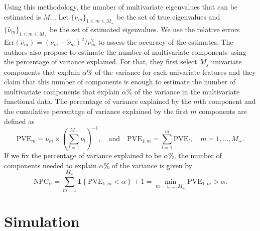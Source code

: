 Using this methodology, the number of multivariate eigenvalues that can be estimated is $M_+$. Let $\{\nu_m\}_{1 \leq m \leq M_+}$ be the set of true eigenvalues and $\{\widehat{\nu}_m\}_{1 \leq m \leq M_+}$ be the set of estimated eigenvalues. We use the relative errors $\text{Err}(\widehat{\nu}_m)  = (\nu_m - \widehat{\nu}_m)^2 / \nu^2_m$ to assess the accuracy of the estimates. The authors also propose to estimate the number of multivariate components using the percentage of variance explained. For that, they first select $M_j$ univariate components that explain $\alpha\%$ of the variance for each univariate features \cite[Chapter 8.2]{ramsayFunctionalDataAnalysis2005} and they claim that this number of components is enough to estimate the number of multivariate components that explain $\alpha\%$ of the variance in the multivariate functional data. The percentage of variance explained by the $m$th component and the cumulative percentage of variance explained by the first $m$ components are defined as
\begin{equation}\label{eq:pve}
     \text{PVE}_m = \nu_m \times \left(\sum_{l = 1}^{M_+} \nu_l\right)^{-1}, \quad\text{and}\quad \text{PVE}_{1:m} = \sum_{l = 1}^m \text{PVE}_l, \quad m = 1, \dots, M_+.
\end{equation}
If we fix the percentage of variance explained to be $\alpha\%$, the number of components needed to explain $\alpha\%$ of the variance is given by
\begin{equation}\label{eq:npc}
     \text{NPC}_{\alpha} = \sum_{m = 1}^{M_{+}} \mathbf{1}\left\{\text{PVE}_{1:m} < \alpha\right\} + 1 = \min_{m = 1, \dots, M_+} \text{PVE}_{1:m} > \alpha.
\end{equation}



\section{Simulation} %
\label{sec:simulation}

